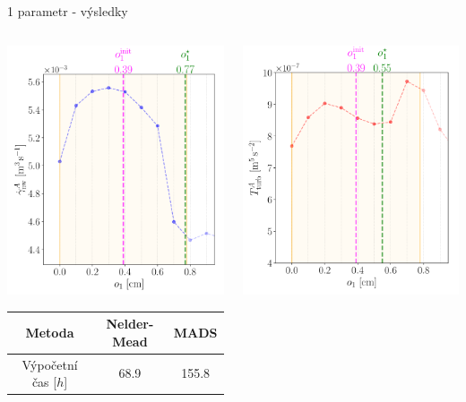 \documentclass[aspectratio=169,xcolor=dvipsnames]{beamer}
\begin{document}
\begin{frame}{1 parametr - výsledky}
	\begin{columns}
		\begin{column}{.5\textwidth}
			\includegraphics[width=0.7\linewidth, trim={0 0 0 3mm}, clip]{Images/problem1a.png}		
			\bgroup
			\tiny
			\centering
			\setlength\tabcolsep{5mm}
			\def\arraystretch{1.3}%
			\begin{tabular}{|c|c|c|}
				\hline
   				Metoda & Nelder-Mead & MADS \\ \hline
				Výpočetní čas [$h$] & 68.9 & 155.8 \\ \hline
			\end{tabular}
			\egroup	
		\end{column}
		\begin{column}{.5\textwidth}
			\includegraphics[width=0.7\linewidth, trim={0 0 0 1.5mm}, clip]{Images/problem1b.png}

\end{column}
\end{columns}
\end{frame}
\end{document}

